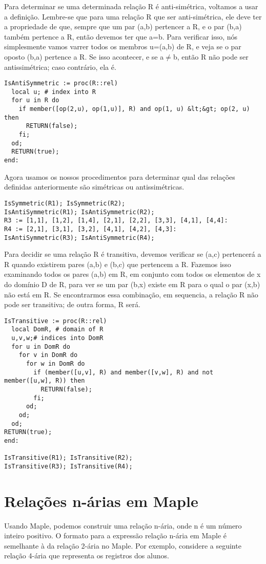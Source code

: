\documentclass[a4paper]{article}
\begin{document}
Para determinar se uma determinada relação R é anti-simétrica, voltamos a usar a definição. Lembre-se que para uma relação R que ser anti-simétrica, ele deve ter a propriedade de que, sempre que um par (a,b) pertencer a R, e o par (b,a) também pertence a R, então devemos ter que a=b. Para verificar isso, nós simplesmente vamos varrer todos os membros u=(a,b) de R, e veja se o par oposto (b,a) pertence a R. Se isso acontecer, e se a$\neq$b, então R não pode ser antissimétrica; caso contrário, ela é.

\begin{lstlisting}
IsAntiSymmetric := proc(R::rel)
  local u; # index into R
  for u in R do
    if member([op(2,u), op(1,u)], R) and op(1, u) &lt;&gt; op(2, u) then
      RETURN(false);
    fi;
  od;
  RETURN(true);
end:
\end{lstlisting}

Agora usamos os nossos procedimentos para determinar qual das relações definidas anteriormente são simétricas ou antissimétricas.

\begin{lstlisting}
IsSymmetric(R1); IsSymmetric(R2);
IsAntiSymmetric(R1); IsAntiSymmetric(R2);
R3 := [1,1], [1,2], [1,4], [2,1], [2,2], [3,3], [4,1], [4,4]:
R4 := [2,1], [3,1], [3,2], [4,1], [4,2], [4,3]:
IsAntiSymmetric(R3); IsAntiSymmetric(R4);
\end{lstlisting}

Para decidir se uma relação R é transitiva, devemos verificar se (a,c) pertencerá a R quando existirem pares (a,b) e (b,c) que pertencem a R. Fazemos isso examinando todos os pares (a,b) em R, em conjunto com todos os elementos de x do domínio D de R, para ver se um par (b,x) existe em R para o qual o par (x,b) não está em R. Se encontrarmos essa combinação, em sequencia, a relação R não pode ser transitiva; de outra forma, R será.

\begin{lstlisting}
IsTransitive := proc(R::rel)
  local DomR, # domain of R
  u,v,w;# indices into DomR
  for u in DomR do
    for v in DomR do
      for w in DomR do
        if (member([u,v], R) and member([v,w], R) and not member([u,w], R)) then
          RETURN(false);
        fi;
      od;
    od;
  od;
RETURN(true);
end:

IsTransitive(R1); IsTransitive(R2);
IsTransitive(R3); IsTransitive(R4);
\end{lstlisting}

\section{Relações n-árias em Maple}
Usando Maple, podemos construir uma relação n-ária, onde n é um número inteiro positivo. O formato para a expressão relação n-ária em Maple é semelhante à da relação 2-ária no Maple. Por exemplo, considere a seguinte relação 4-ária que representa os registros dos alunos.
\end{document}
